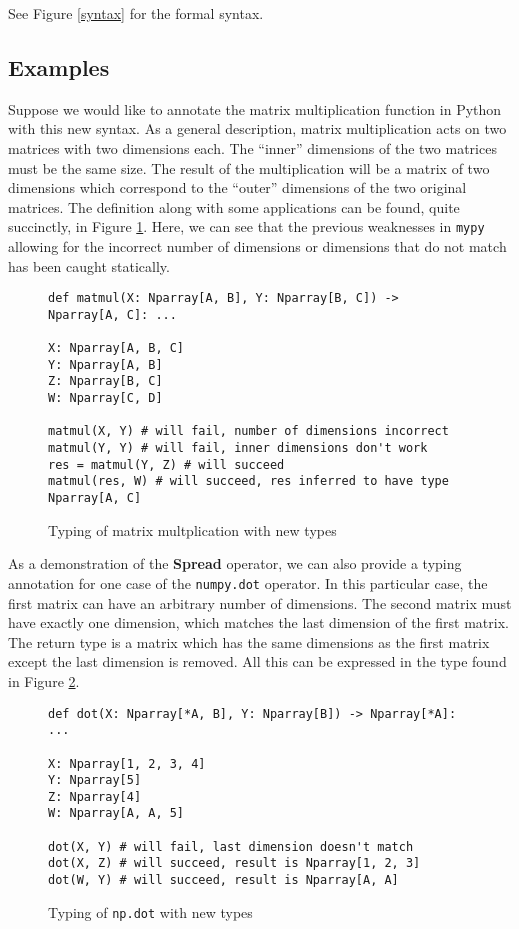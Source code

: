 \documentclass{book}
\begin{document}
See Figure \ref{syntax} for the formal syntax.

\subsection{Examples}

Suppose we would like to annotate the matrix multiplication function in Python with this new syntax. As a general description, matrix multiplication acts on two matrices with two dimensions each. The ``inner'' dimensions of the two matrices must be the same size. The result of the multiplication will be a matrix of two dimensions which correspond to the ``outer'' dimensions of the two original matrices. The definition along with some applications can be found, quite succinctly, in Figure \ref{np-type-matmul}. Here, we can see that the previous weaknesses in \texttt{mypy} allowing for the incorrect number of dimensions or dimensions that do not match has been caught statically.

\begin{figure}
    \centering
    \begin{verbatim}
def matmul(X: Nparray[A, B], Y: Nparray[B, C]) -> Nparray[A, C]: ...

X: Nparray[A, B, C]
Y: Nparray[A, B]
Z: Nparray[B, C]
W: Nparray[C, D]

matmul(X, Y) # will fail, number of dimensions incorrect
matmul(Y, Y) # will fail, inner dimensions don't work
res = matmul(Y, Z) # will succeed
matmul(res, W) # will succeed, res inferred to have type Nparray[A, C]\end{verbatim}
    \caption{Typing of matrix multplication with new types}
    \label{np-type-matmul}
\end{figure}

As a demonstration of the \textbf{Spread} operator, we can also provide a typing annotation for one case of the \texttt{numpy.dot} operator. In this particular case, the first matrix can have an arbitrary number of dimensions. The second matrix must have exactly one dimension, which matches the last dimension of the first matrix. The return type is a matrix which has the same dimensions as the first matrix except the last dimension is removed. All this can be expressed in the type found in Figure \ref{np-type-dot}.

\begin{figure}
    \begin{verbatim}
def dot(X: Nparray[*A, B], Y: Nparray[B]) -> Nparray[*A]: ...

X: Nparray[1, 2, 3, 4]
Y: Nparray[5]
Z: Nparray[4]
W: Nparray[A, A, 5]

dot(X, Y) # will fail, last dimension doesn't match
dot(X, Z) # will succeed, result is Nparray[1, 2, 3]
dot(W, Y) # will succeed, result is Nparray[A, A]\end{verbatim}
    \caption{Typing of \texttt{np.dot} with new types}
    \label{np-type-dot}
\end{figure}
\end{document}
